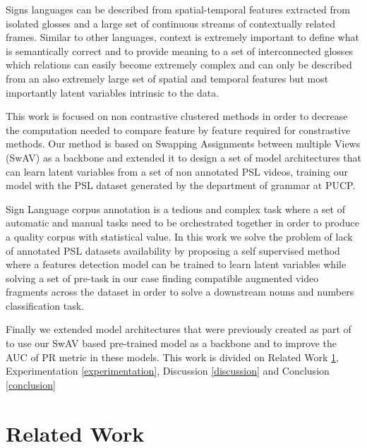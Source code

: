 \documentclass[twocolumn,conference]{article}
\begin{document}
Signs languages can be described from spatial-temporal features extracted from isolated glosses and a large set of continuous streams of contextually related frames.  Similar to other languages, context is extremely important to define what is semantically correct and to provide meaning to a set of interconnected glosses which relations can easily become extremely complex and can only be described from an also extremely large set of spatial and temporal features but most importantly latent variables intrinsic to the data. 

This work is focused on non contrastive clustered methods in order to decrease the computation needed to compare feature by feature required for constrastive methods. Our method is based on Swapping Assignments between multiple Views (SwAV) \cite{caron2020unsupervised} as a backbone and extended it to design a set of model architectures that can learn latent variables from a set of non annotated PSL videos, training our model with the PSL dataset generated by the department of grammar at PUCP.

Sign Language corpus annotation is a tedious and complex task where a set of automatic and manual tasks need to be orchestrated together in order to produce a quality corpus with statistical value. In this work we solve the problem of lack of annotated PSL datasets availability by proposing a self supervised method where a features detection model can be trained to learn latent variables while solving a set of pre-task in our case finding compatible augmented video fragments across the dataset in order to solve a downstream nouns and numbers classification task.

Finally we extended model architectures that were previously created as part of \cite{Pereyra_2021_CVPR} to use our SwAV based pre-trained model as a backbone and to improve the AUC of PR metric in these models. This work is divided on Related Work \ref{related-work},  Experimentation \ref{experimentation},  Discussion \ref{discussion} and Conclusion \ref{conclusion}

\section{Related Work}\label{related-work}
\end{document}
